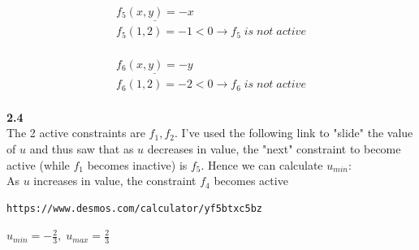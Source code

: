 \documentclass[fleqn]{article}
\begin{document}
\begin{multline*}
\underline{f_5(x,y) = -x} \\
f_5(1,2) = -1<0 \rightarrow \boxed{f_5 \; is \; not \; active}
\end{multline*} \\

\begin{multline*}
\underline{f_6(x,y) = -y} \\
f_6(1,2) = -2<0 \rightarrow \boxed{f_6 \; is \; not \; active}
\end{multline*} \\

\textbf{2.4} \\
The 2 active constraints are $f_1, f_2$. I've used the following link to "slide" the value of $u$ and thus saw that as $u$ decreases in value, the "next" constraint to become active (while $f_1$ becomes inactive) is $f_5$. Hence we can calculate $u_{min}$: \\

As $u$ increases in value, the constraint $f_4$ becomes active

\begin{lstlisting}[breaklines]
https://www.desmos.com/calculator/yf5btxc5bz
\end{lstlisting} 

$u_{min} = -\frac{2}{3}, \; u_{max} = \frac{2}{3}$
\end{document}

